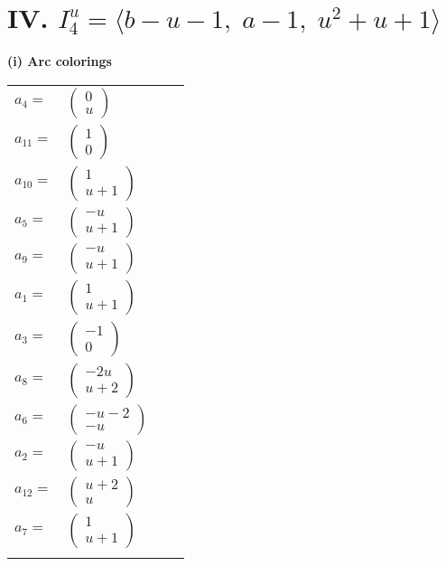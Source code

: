 \documentclass[1p]{elsarticle_modified}
\theoremstyle{definition}
\begin{document}
\centering \section*{IV. $I^u_{4}= \langle b- u-1,\;a-1,\;u^2+u+1 \rangle$}
\flushleft \textbf{(i) Arc colorings}\\
\begin{tabular}{m{7pt} m{180pt} m{7pt} m{180pt} }
\flushright $a_{4}=$&$\begin{pmatrix}0\\u\end{pmatrix}$ \\
\flushright $a_{11}=$&$\begin{pmatrix}1\\0\end{pmatrix}$ \\
\flushright $a_{10}=$&$\begin{pmatrix}1\\u+1\end{pmatrix}$ \\
\flushright $a_{5}=$&$\begin{pmatrix}- u\\u+1\end{pmatrix}$ \\
\flushright $a_{9}=$&$\begin{pmatrix}- u\\u+1\end{pmatrix}$ \\
\flushright $a_{1}=$&$\begin{pmatrix}1\\u+1\end{pmatrix}$ \\
\flushright $a_{3}=$&$\begin{pmatrix}-1\\0\end{pmatrix}$ \\
\flushright $a_{8}=$&$\begin{pmatrix}-2 u\\u+2\end{pmatrix}$ \\
\flushright $a_{6}=$&$\begin{pmatrix}- u-2\\- u\end{pmatrix}$ \\
\flushright $a_{2}=$&$\begin{pmatrix}- u\\u+1\end{pmatrix}$ \\
\flushright $a_{12}=$&$\begin{pmatrix}u+2\\u\end{pmatrix}$ \\
\flushright $a_{7}=$&$\begin{pmatrix}1\\u+1\end{pmatrix}$\\&\end{tabular}
\end{document}
